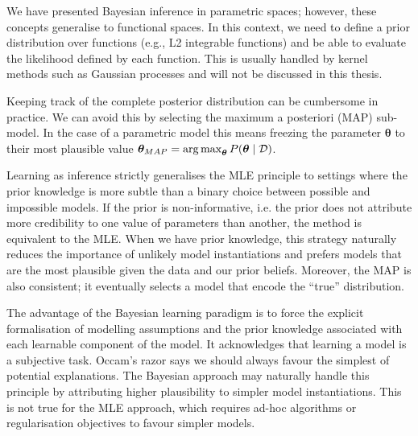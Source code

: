 We have presented Bayesian inference in parametric spaces; however, these concepts generalise to functional spaces. In this context, we need to define a prior distribution over functions (e.g., L2 integrable functions) and be able to evaluate the likelihood defined by each function. This is usually handled by kernel methods such as Gaussian processes and will not be discussed in this thesis.

Keeping track of the complete posterior distribution can be cumbersome in practice. We can avoid this by selecting the maximum a posteriori (MAP) sub-model. In the case of a parametric model this means freezing the parameter $\bm \theta$ to their most plausible value $\bm \theta_{MAP} = \operatorname*{arg\,max}_{\bm \theta} P(\bm \theta \mid \mathcal{D})$.

Learning as inference strictly generalises the MLE principle to settings where the prior knowledge is more subtle than a binary choice between possible and impossible models. If the prior is non-informative, i.e. the prior does not attribute more credibility to one value of parameters than another, the method is equivalent to the MLE. When we have prior knowledge, this strategy naturally reduces the importance of unlikely model instantiations and prefers models that are the most plausible given the data and our prior beliefs. Moreover, the MAP is also consistent; it eventually selects a model that encode the ``true'' distribution.

The advantage of the Bayesian learning paradigm is to force the explicit formalisation of modelling assumptions and the prior knowledge associated with each learnable component of the model. It acknowledges that learning a model is a subjective task. Occam's razor says we should always favour the simplest of potential explanations. The Bayesian approach may naturally handle this principle by attributing higher plausibility to simpler model instantiations. This is not true for the MLE approach, which requires ad-hoc algorithms or regularisation objectives to favour simpler models.

%
